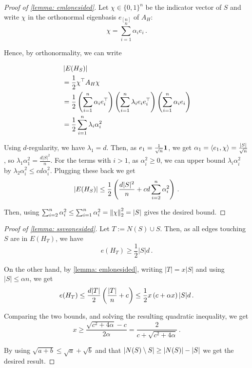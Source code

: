 \begin{proof}[Proof of \cref{lemma: emlonesided}]
    Let $\chi \in \{0,1\}^n$ be the indicator vector of $S$ and write $\chi$ in the orthonormal eigenbasis $e_{[n]}$ of $A_H$:
    $$\chi = \sum_{i=1}^n \alpha_i e_i\,.$$

    Hence, by orthonormality, we can write

    \begin{align*}
        &\left\lvert E(H_S)\right\rvert\\
        &=\frac{1}{2} \chi^\top A_H \chi\\
        &=\frac{1}{2} \left(\sum_{i=1}^n \alpha_i e_i^\top \right) \left(\sum_{i=1}^n \lambda_i e_i e_i^\top \right) \left(\sum_{i=1}^n \alpha_i e_i\right)\\
        &=\frac{1}{2} \sum_{i=1}^n \lambda_i \alpha_i^2
    \end{align*}

    Using $d$-regularity, we have $\lambda_1=d$.
    Then, as $e_1=\frac{1}{\sqrt{n}}\mathbf{1}$, we get $\alpha_1=\left\langle e_1, \chi \right\rangle=\frac{|S|}{\sqrt{n}}$, so $\lambda_1 \alpha_1^2=\frac{d|S|^2}{n}$.
    For the terms with $i>1$, as $\alpha_i^2\geq 0$, we can upper bound $\lambda_i \alpha_i^2$ by $\lambda_2 \alpha_i^2\leq cd\alpha_i^2$.
    Plugging these back we get
    $$\left\lvert E(H_S)\right\rvert\leq \frac{1}{2}\left(\frac{d|S|^2}{n} + cd\sum_{i=2}^n \alpha_i^2\right)\,.$$

    Then, using $\sum_{i=2}^n \alpha_i^2\leq \sum_{i=1}^n \alpha_i^2=\left\lVert\chi\right\rVert_2^2=|S|$ gives the desired bound.
\end{proof}

\begin{proof}[Proof of \cref{lemma: ssveonesided}]
    Let $T:=N(S)\cup S$.
    Then, as all edges touching $S$ are in $E(H_{T})$, we have
    $$e(H_{T})\geq \frac{1}{2}|S|d\,.$$ 

    On the other hand, by \cref{lemma: emlonesided}, writing $|T|=x|S|$ and using $|S|\leq \alpha n$, we get
    $$e(H_{T})\leq \frac{d|T|}{2}\left(\frac{|T|}{n}+c\right)\leq\frac{1}{2}x\left(c+\alpha x\right)|S|d\,.$$

    Comparing the two bounds, and solving the resulting quadratic inequality, we get 
    $$x\geq \frac{\sqrt{c^2 + 4\alpha}-c}{2\alpha}=\frac{2}{c+\sqrt{c^2+4\alpha}}\,.$$

    By using $\sqrt{a+b}\leq \sqrt{a}+\sqrt{b}$ and that $\left\lvert N(S)\setminus S\right\rvert\geq \left\lvert N(S)\right\rvert-|S|$ we get the desired result.
\end{proof}


